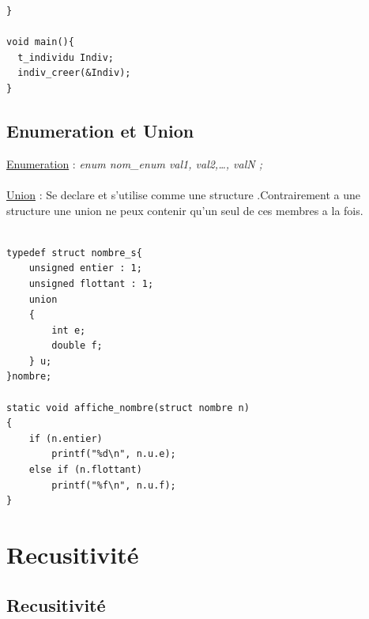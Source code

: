 \documentclass[a4paper,12pt,openany]{book}
\begin{document}
{\begin{verbatim}
}

void main(){
  t_individu Indiv;
  indiv_creer(&Indiv);
}
\end{verbatim}


\section{Enumeration et Union}

\underline{Enumeration} : \emph{enum nom\_enum { val1, val2,\ldots, valN };}\\
\\
\underline{Union} : Se declare et s'utilise comme une structure .Contrairement a une structure une union ne peux contenir qu'un seul de ces membres a la fois. \\
\\
\begin{verbatim}
typedef struct nombre_s{
    unsigned entier : 1;
    unsigned flottant : 1;
    union
    {
        int e;
        double f;
    } u;
}nombre;

static void affiche_nombre(struct nombre n)
{
    if (n.entier)
        printf("%d\n", n.u.e);
    else if (n.flottant)
        printf("%f\n", n.u.f);
}
\end{verbatim}





\chapter{Recusitivité}

\section{Recusitivité}

}
\end{document}
